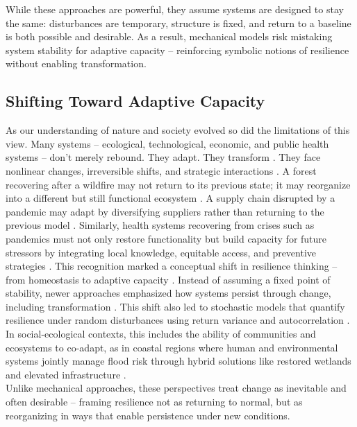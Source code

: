While these approaches are powerful, they assume systems are designed to stay the same: disturbances are temporary, structure is fixed, and return to a baseline is both possible and desirable. As a result, mechanical models risk mistaking system stability for adaptive capacity -- reinforcing symbolic notions of resilience without enabling transformation.

\subsection{Shifting Toward Adaptive Capacity}
\label{appendix:A2}
As our understanding of nature and society evolved so did the limitations of this view. Many systems -- ecological, technological, economic, and public health systems -- don’t merely rebound. They adapt. They transform \autocite{folke2010resilience}. They face nonlinear changes, irreversible shifts, and strategic interactions \autocite{gunderson2002panarchy}. A forest recovering after a wildfire may not return to its previous state; it may reorganize into a different but still functional ecosystem \autocite{walker2004resilience}. A supply chain disrupted by a pandemic may adapt by diversifying suppliers rather than returning to the previous model \autocite{ivanov2022viable}. Similarly, health systems recovering from crises such as pandemics must not only restore functionality but build capacity for future stressors by integrating local knowledge, equitable access, and preventive strategies \autocite{norris2008community, kruk2017building}. This recognition marked a conceptual shift in resilience thinking -- from homeostasis to adaptive capacity \autocite{folke2004regime}. Instead of assuming a fixed point of stability, newer approaches emphasized how systems persist through change, including transformation \autocite{walker2004resilience}. This shift also led to stochastic models that quantify resilience under random disturbances using return variance and autocorrelation \autocite{ives1995measuring}. In social-ecological contexts, this includes the ability of communities and ecosystems to co-adapt, as in coastal regions where human and environmental systems jointly manage flood risk through hybrid solutions like restored wetlands and elevated infrastructure \autocite{adger2005socialecological}.\\

Unlike mechanical approaches, these perspectives treat change as inevitable and often desirable -- framing resilience not as returning to normal, but as reorganizing in ways that enable persistence under new conditions.

